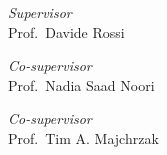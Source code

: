 \documentclass[../thesis.tex]{subfiles}
\begin{document}
    \begin{titlepage}
        \begin{center}
            \begin{LARGE}
                \textbf{\myUni}\\
            \end{LARGE}

            \vspace{10pt}

            \begin{large}
                \textsc{\myDepartment}\\
                \textsc{\myFaculty}\\
            \end{large}

            \vspace{10pt}

            \begin{LARGE}
                \begin{center}
                    \textbf{\myTitle}\\
                \end{center}
            \end{LARGE}

            \begin{large}
                \textsl{\myDegree}\\
            \end{large}

            \vspace{100pt}

            \begin{large}
                \begin{flushleft}
                    \textit{Supervisor}\\
                    \vspace{1pt}
                    Prof.\ Davide Rossi
                \end{flushleft}
                \begin{flushleft}
                    \textit{Co-supervisor}\\
                    \vspace{1pt}
                    Prof.\ Nadia Saad Noori
                \end{flushleft}
                \begin{flushleft}
                    \textit{Co-supervisor}\\
                    \vspace{1pt}
                    Prof.\ Tim A. Majchrzak
                \end{flushleft}
            

\end{large}
\end{center}
\end{titlepage}
\end{document}
